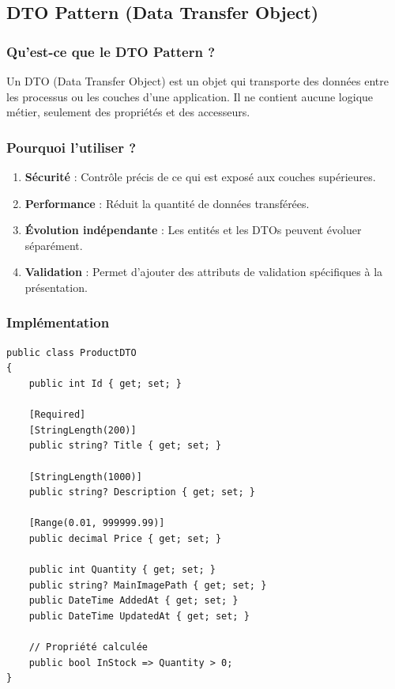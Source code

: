 \documentclass[12pt,a4paper]{article}
\begin{document}
\subsection{DTO Pattern (Data Transfer Object)}

\subsubsection{Qu'est-ce que le DTO Pattern ?}

Un DTO (Data Transfer Object) est un objet qui transporte des données entre les processus ou les couches d'une application. Il ne contient aucune logique métier, seulement des propriétés et des accesseurs.

\subsubsection{Pourquoi l'utiliser ?}

\begin{enumerate}
    \item \textbf{Sécurité} : Contrôle précis de ce qui est exposé aux couches supérieures.
    \item \textbf{Performance} : Réduit la quantité de données transférées.
    \item \textbf{Évolution indépendante} : Les entités et les DTOs peuvent évoluer séparément.
    \item \textbf{Validation} : Permet d'ajouter des attributs de validation spécifiques à la présentation.
\end{enumerate}

\subsubsection{Implémentation}

\begin{lstlisting}[caption=ProductDTO, float=h!]
public class ProductDTO
{
    public int Id { get; set; }
    
    [Required]
    [StringLength(200)]
    public string? Title { get; set; }
    
    [StringLength(1000)]
    public string? Description { get; set; }
    
    [Range(0.01, 999999.99)]
    public decimal Price { get; set; }
    
    public int Quantity { get; set; }
    public string? MainImagePath { get; set; }
    public DateTime AddedAt { get; set; }
    public DateTime UpdatedAt { get; set; }
    
    // Propriété calculée
    public bool InStock => Quantity > 0;
}
\end{lstlisting}
\end{document}
